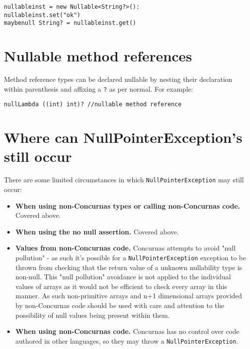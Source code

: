 \documentclass[conc-doc]{subfiles}
\begin{document}
\begin{lstlisting}
nullableinst = new Nullable<String?>():
nullableinst.set("ok")
maybenull String? = nullableinst.get()
\end{lstlisting}


\section{Nullable method references}
Method reference types can be declared nullable by nesting their declaration within parenthesis and affixing a \lstinline{?} as per normal. For example:

\begin{lstlisting}
nullLambda ((int) int)? //nullable method reference
\end{lstlisting}

\section{Where can NullPointerException's still occur}
There are some limited circumstances in which \lstinline{NullPointerException} may still occur:

\begin{itemize}
	\item \textbf{When using non-Concurnas types or calling non-Concurnas code.} Covered above.
	\item \textbf{When using the no null assertion.} Covered above.
	\item \textbf{Values from non-Concurnas code.} Concurnas attempts to avoid "null pollution" - as such it's possible for a \lstinline{NullPointerException} exception to be thrown from checking that the return value of a unknown nullability type is non-null. This "null pollution" avoidance is not applied to the individual values of arrays as it would not be efficient to check every array in this manner. As such non-primitive arrays and n+1 dimensional arrays provided by non-Concurnas code should be used with care and attention to the possibility of null values being present within them.
	\item \textbf{When using non-Concurnas code.} Concurnas has no control over code authored in other languages, so they may throw a \lstinline{NullPointerException}.
\end{itemize}
\end{document}
